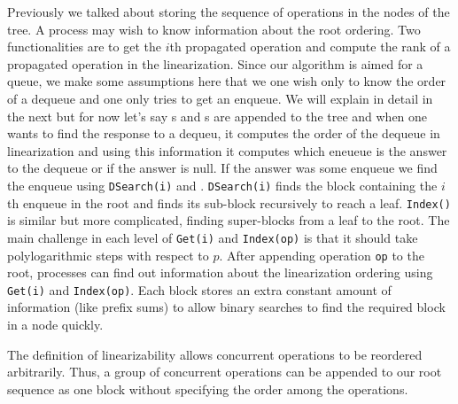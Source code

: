 \documentclass[10pt]{article}
\newcommand{\nf}[1]{{\normalfont{\texttt{#1}}}}
\theoremstyle{definition}
\begin{document}
Previously we talked about storing the sequence of operations in the nodes of the tree. A process may wish to know information about the root ordering. Two functionalities are to get the $i$th propagated operation and compute the rank of a propagated operation in the linearization. Since our algorithm is aimed for a queue, we make some assumptions here that we one wish only to know the order of a dequeue and one only tries to get an enqueue. We will explain in detail in the next but for now let's say \nf{enqueue}s and \nf{dequeue}s are appended to the tree and when one wants to find the response to a dequeu, it computes the order of the dequeue in linearization and using this information it computes which eneueue is the answer to the dequeue or if the answer is null. If the answer was some enqueue we find the enqueue using \texttt{DSearch(i)} and \nf{GetENQ(n,b,i)}. \texttt{DSearch(i)} finds the block containing the $i$th enqueue in the root and \nf{GetENQ(n,b,i)} finds its sub-block recursively to reach a leaf. \texttt{Index()} is similar but more complicated, finding super-blocks from a leaf to the root. The main challenge in each level of \texttt{Get(i)} and \texttt{Index(op)} is that it should take polylogarithmic steps with respect to $p$. After appending operation \texttt{op} to the root, processes can find out information about the linearization ordering using \texttt{Get(i)} and \texttt{Index(op)}. Each block stores an extra constant amount of information (like prefix sums) to allow binary searches to find the required block in a node quickly.

 \pagebreak
 
 



The definition of linearizability allows concurrent operations to be reordered arbitrarily. Thus, a group of concurrent operations can be appended to our root sequence as one block without specifying the order among the operations.
\end{document}

